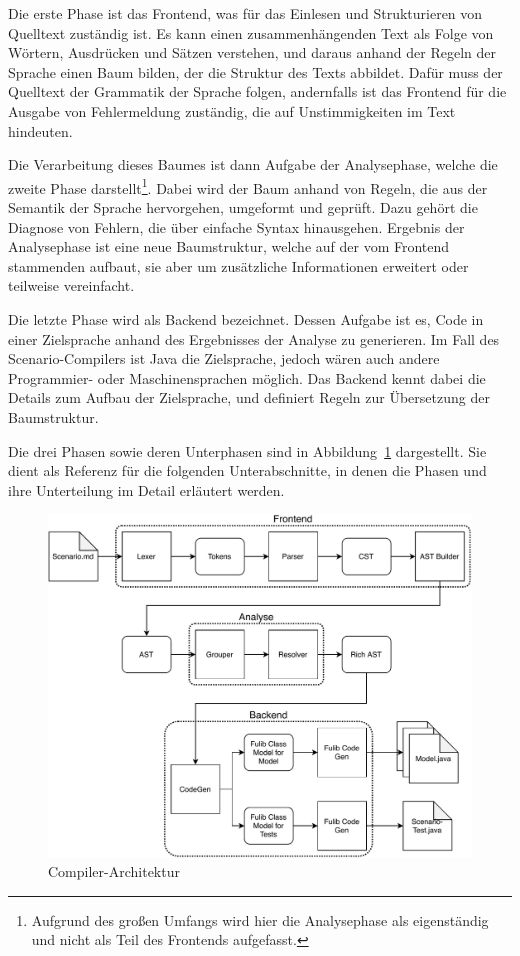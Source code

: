 Die erste Phase ist das Frontend, was für das Einlesen und Strukturieren von Quelltext zuständig ist.
Es kann einen zusammenhängenden Text als Folge von Wörtern, Ausdrücken und Sätzen verstehen,
und daraus anhand der Regeln der Sprache einen Baum bilden,
der die Struktur des Texts abbildet.
Dafür muss der Quelltext der Grammatik der Sprache folgen,
andernfalls ist das Frontend für die Ausgabe von Fehlermeldung zuständig,
die auf Unstimmigkeiten im Text hindeuten.

Die Verarbeitung dieses Baumes ist dann Aufgabe der Analysephase, welche die zweite Phase darstellt\footnote{Aufgrund des großen Umfangs wird hier die Analysephase als eigenständig und nicht als Teil des Frontends aufgefasst.}.
Dabei wird der Baum anhand von Regeln, die aus der Semantik der Sprache hervorgehen, umgeformt und geprüft.
Dazu gehört die Diagnose von Fehlern, die über einfache Syntax hinausgehen.
Ergebnis der Analysephase ist eine neue Baumstruktur,
welche auf der vom Frontend stammenden aufbaut, sie aber um zusätzliche Informationen erweitert oder teilweise vereinfacht.

Die letzte Phase wird als Backend bezeichnet.
Dessen Aufgabe ist es, Code in einer Zielsprache anhand des Ergebnisses der Analyse zu generieren.
Im Fall des Scenario-Compilers ist Java die Zielsprache, jedoch wären auch andere Programmier- oder Maschinensprachen möglich.
Das Backend kennt dabei die Details zum Aufbau der Zielsprache,
und definiert Regeln zur Übersetzung der Baumstruktur.

Die drei Phasen sowie deren Unterphasen sind in Abbildung~\ref{fig:compiler-architecture} dargestellt.
Sie dient als Referenz für die folgenden Unterabschnitte,
in denen die Phasen und ihre Unterteilung im Detail erläutert werden.

\begin{figure}
    \includegraphics[width=\textwidth]{chapter/fulib-scenarios/img/architecture.pdf}
    \caption{Compiler-Architektur}
    \label{fig:compiler-architecture}
\end{figure}


